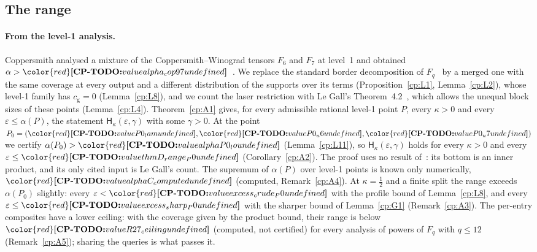 \documentclass[11pt]{article}
\makeatletter
\theoremstyle{definition}
\theoremstyle{remark}
\DeclareRobustCommand{\CPTODO}[1]{{\color{red}\textbf{[CP-TODO:} #1\textbf{]}}}
\providecommand{\eps}{\varepsilon}
\newcommand{\Hypk}[1]{\mathsf{H}_{#1}}        %
\newcommand{\cg}{c_{\mathrm g}}               %
\newcommand{\Pzero}{P_0}                      %
\newcommand{\cpv}[1]{\ifcsname cpv@#1\endcsname\csname cpv@#1\endcsname\else\CPTODO{value #1 undefined}\fi}
\makeatother
\begin{document}
\subsection{The range}\label{cp:sec:intro:range}

\paragraph{From the level-1 analysis.} Coppersmith analysed a mixture of the Coppersmith--Winograd tensors $F_6$ and $F_7$ at level~1 and obtained $\alpha>\cpv{alpha_cop97}$~\cite{Cop97}. We replace the standard border decomposition of $F_q$~\cite{CW90} by a merged one with the same coverage at every output and a different distribution of the supports over its terms (Proposition~\ref{cp:L1}, Lemma~\ref{cp:L2}), whose level-1 family has $\cg=0$ (Lemma~\ref{cp:L8}), and we count the laser restriction with Le Gall's Theorem~4.2~\cite{LG12}, which allows the unequal block sizes of these points (Lemma~\ref{cp:L4}). Theorem~\ref{cp:A1} gives, for every admissible rational level-1 point $P$, every $\kappa>0$ and every $\eps\le\alpha(P)$, the statement $\Hypk\kappa(\eps,\gamma)$ with some $\gamma>0$. At the point $\Pzero=(\cpv{P0_lam},\cpv{P0_u6},\cpv{P0_u7})$ we certify $\alpha(\Pzero)>\cpv{alphaP0_lo}$ (Lemma~\ref{cp:L11}), so $\Hypk\kappa(\eps,\gamma)$ holds for every $\kappa>0$ and every $\eps\le\cpv{thmD_range_P0}$ (Corollary~\ref{cp:A2}). The proof uses no result of~\cite{v2}: its bottom is an inner product, and its only cited input is Le Gall's count. The supremum of $\alpha(P)$ over level-1 points is known only numerically, $\cpv{alphaC_computed}$ (computed, Remark~\ref{cp:A4}). At $\kappa=\frac12$ and a finite split the range exceeds $\alpha(\Pzero)$ slightly: every $\eps<\cpv{excess_crude_P0}$ with the profile bound of Lemma~\ref{cp:L8}, and every $\eps\le\cpv{excess_sharp_P0}$ with the sharper bound of Lemma~\ref{cp:G1} (Remark~\ref{cp:A3}). The per-entry composites have a lower ceiling: with the coverage given by the product bound, their range is below $\cpv{R27_ceiling}$ (computed, not certified) for every analysis of powers of $F_q$ with $q\le12$ (Remark~\ref{cp:A5}); sharing the queries is what passes it.
\end{document}
